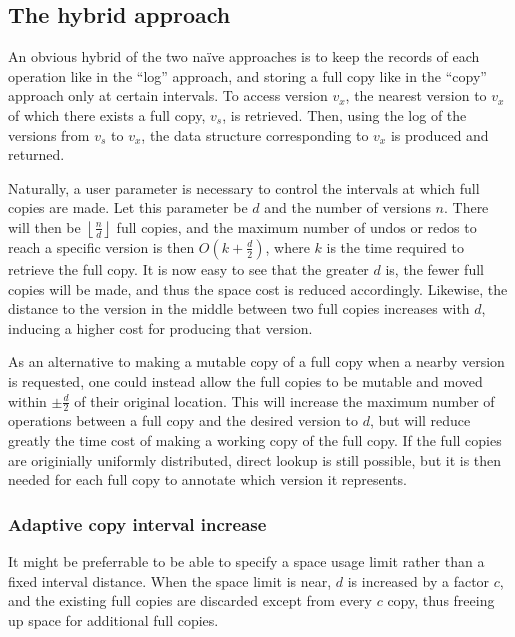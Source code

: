 \subsection{The hybrid approach}
An obvious hybrid of the two na\"ive approaches is to keep the records of each
operation like in the ``log'' approach, and storing a full copy like in the
``copy'' approach only at certain intervals. To access version $v_x$, the
nearest version to $v_x$ of which there exists a full copy, $v_s$, is retrieved.
Then, using the log of the versions from $v_s$ to $v_x$, the data structure
corresponding to $v_x$ is produced and returned.

Naturally, a user parameter is necessary to control the intervals at which full
copies are made. Let this parameter be $d$ and the number of versions $n$. There
will then be $\left\lfloor \frac{n}{d} \right\rfloor$ full copies, and the
maximum number of undos or redos to reach a specific version is then
$O(k+\frac{d}{2})$, where $k$ is the time required to retrieve the full copy. It
is now easy to see that the greater $d$ is, the fewer full copies will be made,
and thus the space cost is reduced accordingly. Likewise, the distance to the
version in the middle between two full copies increases with $d$, inducing a
higher cost for producing that version.

As an alternative to making a mutable copy of a full copy when a nearby version
is requested, one could instead allow the full copies to be mutable and moved
within $\pm\frac{d}{2}$ of their original location. This will increase the
maximum number of operations between a full copy and the desired version to $d$,
but will reduce greatly the time cost of making a working copy of the full copy.
If the full copies are originially uniformly distributed, direct lookup is still
possible, but it is then needed for each full copy to annotate which version it
represents.

\subsubsection{Adaptive copy interval increase}
It might be preferrable to be able to specify a space usage limit rather than a
fixed interval distance. When the space limit is near, $d$ is increased by a
factor $c$, and the existing full copies are discarded except from every $c$
copy, thus freeing up space for additional full copies.


